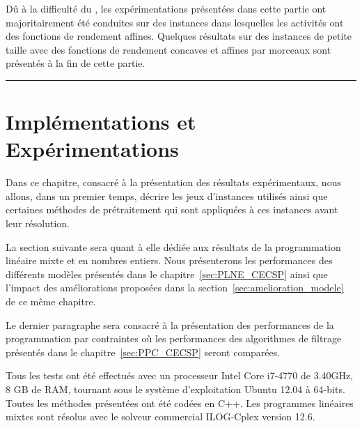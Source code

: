 \begin{center}
\begin{minipage}{\textwidth}
{    Dû à la difficulté du \CECSP, les expérimentations présentées
    dans cette partie ont majoritairement été conduites sur des
    instances dans lesquelles les activités ont des fonctions de
    rendement affines. Quelques résultats sur des instances de petite
    taille avec des fonctions de rendement concaves et affines par
    morceaux sont présentés à la fin de cette partie.}
    \vspace{0.5cm}
    \hrule
  \end{minipage}
\end{center}

\chapter{Implémentations et Expérimentations}
\label{sec:expe}

Dans ce chapitre, consacré à la présentation des résultats
expérimentaux, nous allons, dans un premier temps, décrire les
jeux d'instances utilisés ainsi que certaines méthodes de
prétraitement qui sont appliquées à ces instances avant leur
résolution. 

La section suivante sera quant à elle dédiée aux résultats de la
programmation linéaire mixte et en nombres entiers. Nous présenterons
les performances des différents modèles présentés dans le
chapitre~\ref{sec:PLNE_CECSP} ainsi que l'impact des améliorations
proposées dans la section~\ref{sec:amelioration_modele} de ce même
chapitre. 

Le dernier paragraphe sera consacré à la présentation des performances
de la programmation par contraintes où les performances des
algorithmes de filtrage présentés dans le chapitre~\ref{sec:PPC_CECSP}
seront comparées. 

Tous les tests ont été effectués avec un processeur Intel Core i7-4770
de 3.40GHz, 8 GB de RAM, tournant sous le système d’exploitation
Ubuntu 12.04 à 64-bits. Toutes les méthodes présentées ont été codées
en C++. Les programmes linéaires mixtes sont résolus avec le solveur
commercial ILOG-Cplex version 12.6.











